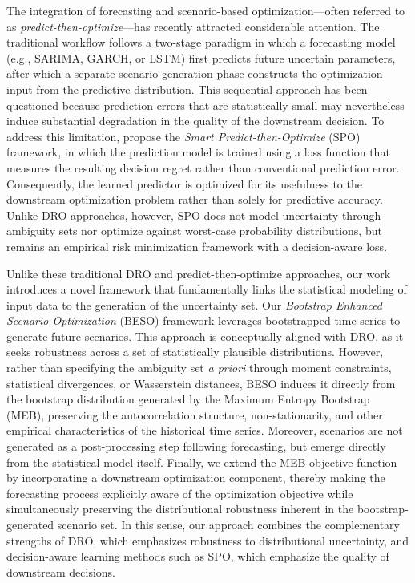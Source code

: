 \documentclass[mnsc,sglanonrev]{informs4}  %
\theoremstyle{remark}\newtheorem{remark}{Remark}
\begin{document}
The integration of forecasting and scenario-based optimization---often referred to as {\it predict-then-optimize}---has recently attracted considerable attention. The traditional workflow follows a two-stage paradigm in which a forecasting model (e.g., SARIMA, GARCH, or LSTM) first predicts future uncertain parameters, after which a separate scenario generation phase constructs the optimization input from the predictive distribution. This sequential approach has been questioned because prediction errors that are statistically small may nevertheless induce substantial degradation in the quality of the downstream decision. To address this limitation, \citet{EG22} propose the {\it Smart Predict-then-Optimize} (SPO) framework, in which the prediction model is trained using a loss function that measures the resulting decision regret rather than conventional prediction error. Consequently, the learned predictor is optimized for its usefulness to the downstream optimization problem rather than solely for predictive accuracy. Unlike DRO approaches, however, SPO does not model uncertainty through ambiguity sets nor optimize against worst-case probability distributions, but remains an empirical risk minimization framework with a decision-aware loss.

Unlike these traditional DRO and predict-then-optimize approaches, our work introduces a novel framework that fundamentally links the statistical modeling of input data to the generation of the uncertainty set. Our {\it Bootstrap Enhanced Scenario Optimization} (BESO) framework leverages bootstrapped time series to generate future scenarios. This approach is conceptually aligned with DRO, as it seeks robustness across a set of statistically plausible distributions. However, rather than specifying the ambiguity set {\it a priori} through moment constraints, statistical divergences, or Wasserstein distances, BESO induces it directly from the bootstrap distribution generated by the Maximum Entropy Bootstrap (MEB), preserving the autocorrelation structure, non-stationarity, and other empirical characteristics of the historical time series. Moreover, scenarios are not generated as a post-processing step following forecasting, but emerge directly from the statistical model itself. Finally, we extend the MEB objective function by incorporating a downstream optimization component, thereby making the forecasting process explicitly aware of the optimization objective while simultaneously preserving the distributional robustness inherent in the bootstrap-generated scenario set. In this sense, our approach combines the complementary strengths of DRO, which emphasizes robustness to distributional uncertainty, and decision-aware learning methods such as SPO, which emphasize the quality of downstream decisions.
\end{document}

